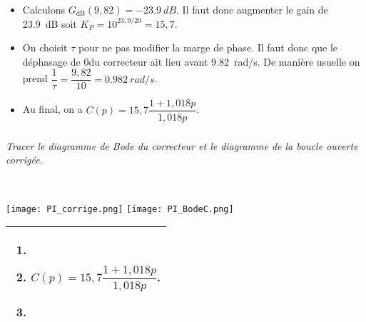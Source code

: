 \begin{multicols}{2}
\begin{corrige}
\begin{itemize}
\item Calculons $G_{\text{dB}}(9,82)=\SI{-23,9}{dB}$. Il faut donc augmenter le gain de \SI{23,9}{dB} soit $K_P=10^{23,9/20}=15,7$.

\item On choisit $\tau$ pour ne pas modifier la marge de phase. Il faut donc que le déphasage de 0\degres du correcteur ait lieu  avant \SI{9,82}{rad/s}. De manière usuelle on prend $\dfrac{1}{\tau}=\dfrac{9,82}{10}=\SI{0,982}{rad/s}$.

\item Au final, on a $C(p)=15,7\dfrac{1+1,018p}{1,018p}$.
\end{itemize}

\end{corrige}
\else\fi

\subparagraph{}\textit{Tracer le diagramme de Bode du correcteur et le diagramme de la boucle ouverte corrigée.}

\ifprof
\begin{corrige}~\\
\begin{center}
\texttt{[image: PI\_corrige.png]}
\texttt{[image: PI\_BodeC.png]}
\end{center}
\end{corrige}
\else
\fi


\ifcolle
\else
\ifprof
\else
\noindent
\begin{tabular}{|p{.9\linewidth}|}
\hline
\begin{enumerate}
\item $\quad$
\item $C(p)=15,7\dfrac{1+1,018p}{1,018p}$.
\item $\quad$
\end{enumerate}\\
\hline
\end{tabular}
\fi
\fi



\end{multicols}

